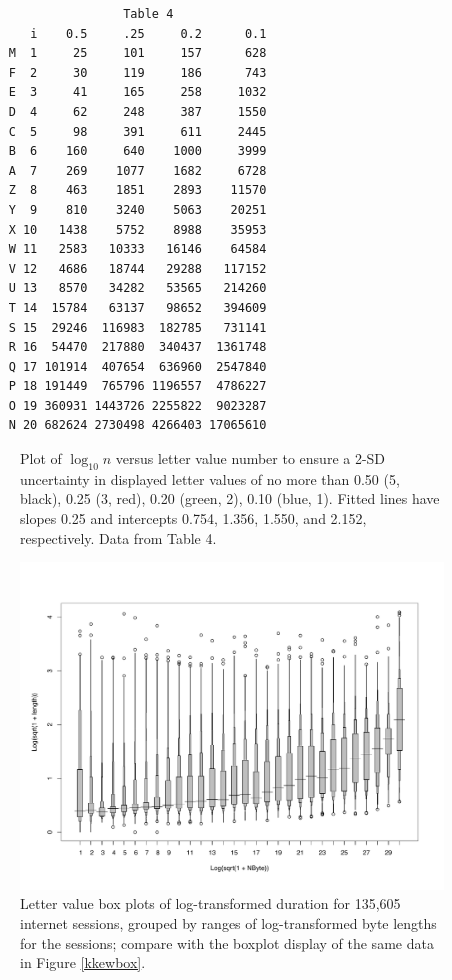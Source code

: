 \documentclass[oneside]{article}
\begin{document}
\begin{verbatim}
                    Table 4
       i    0.5     .25     0.2      0.1
    M  1     25     101     157      628
    F  2     30     119     186      743
    E  3     41     165     258     1032
    D  4     62     248     387     1550
    C  5     98     391     611     2445
    B  6    160     640    1000     3999
    A  7    269    1077    1682     6728
    Z  8    463    1851    2893    11570
    Y  9    810    3240    5063    20251
    X 10   1438    5752    8988    35953
    W 11   2583   10333   16146    64584
    V 12   4686   18744   29288   117152
    U 13   8570   34282   53565   214260
    T 14  15784   63137   98652   394609
    S 15  29246  116983  182785   731141
    R 16  54470  217880  340437  1361748
    Q 17 101914  407654  636960  2547840
    P 18 191449  765796 1196557  4786227
    O 19 360931 1443726 2255822  9023287
    N 20 682624 2730498 4266403 17065610
\end{verbatim}


\begin{figure}[hbtp]
  \centering

  \caption{Plot of $\log_10 n$ versus letter value number to ensure a 2-SD
  uncertainty in displayed letter values of no more than 0.50 (5, black), 0.25
  (3, red), 0.20 (green, 2), 0.10 (blue, 1). Fitted lines have slopes 0.25 and
  intercepts 0.754, 1.356, 1.550, and 2.152, respectively. Data from Table 4.}
  \label{figyy} 
\end{figure}


\begin{figure}[hbtp]
  \centering
  \includegraphics[scale=.6,angle=270]{lvbox2}

  \caption{Letter value box plots of log-transformed duration for 135,605
  internet sessions, grouped by ranges of log-transformed byte lengths for the
  sessions; compare with the boxplot display of the same data in Figure
  \ref{kkewbox}.}
  \label{lvplot2} 
\end{figure}
\end{document}
